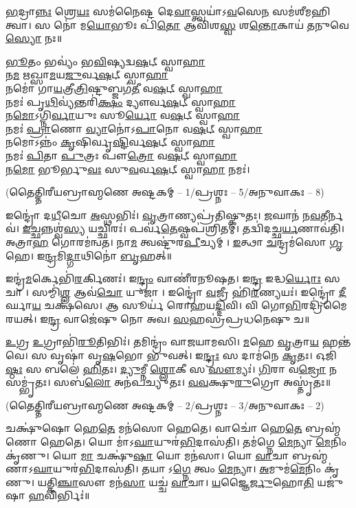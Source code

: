 \ul{𑌭}𑌦𑍍𑌰𑌾\ul{𑌨𑍍𑌨𑌃} 𑌶𑍍𑌰𑍇\ul{𑌯𑌃} 𑌸𑌮॑𑌨𑍈𑌷𑍍𑌟 𑌦𑍇\ul{𑌵𑌾}𑌸𑍍𑌤𑍍𑌵𑌯𑌾॑𑌽\ul{𑌵}𑌸𑍇\ul{𑌨} 𑌸𑌮॑𑌶𑍀𑌮𑌹𑌿 𑌤𑍍𑌵𑌾।
𑌸 𑌨𑍋॑ 𑌮\ul{𑌯𑍋}𑌭𑍂𑌃 𑌪𑌿॑\ul{𑌤𑍋} 𑌆𑌵𑌿॑𑌶\ul{𑌸𑍍𑌵} 𑌶\ul{𑌨𑍍𑌤𑍋}𑌕𑌾𑌯॑ \ul{𑌤}𑌨𑍁𑌵𑍇 \ul{𑌸𑍍𑌯𑍋} 𑌨𑌃॥

\ul{𑌭𑍂}𑌤𑌂 𑌭𑌵𑍍𑌯𑌂॑ 𑌭\ul{𑌵𑌿}𑌷𑍍𑌯𑌦𑍍𑌵\ul{𑌷}𑌟𑍍 𑌸𑍍𑌵𑌾\ul{𑌹𑌾}\\
𑌨\ul{𑌮} 𑌋𑌖𑍍𑌸𑌾\ul{𑌮}𑌯\ul{𑌜𑍁}𑌰𑍍𑌵\ul{𑌷}𑌟𑍍 𑌸𑍍𑌵𑌾\ul{𑌹𑌾}\\
𑌨𑌮𑍋॑ 𑌗𑌾\ul{𑌯}𑌤𑍍𑌰𑍀\ul{𑌤𑍍𑌰𑌿}𑌷𑍍𑌟𑍁𑌬𑍍𑌜𑌗॑\ul{𑌤𑍀} 𑌵\ul{𑌷}𑌟𑍍 𑌸𑍍𑌵𑌾\ul{𑌹𑌾}\\
𑌨𑌮𑌃॑ 𑌪𑍃\ul{𑌥𑌿}𑌵𑍍𑌯॑𑌨𑍍𑌤𑌰𑌿॑\ul{𑌕𑍍𑌷𑌂} 𑌦𑍍𑌯𑍗𑌰𑍍𑌵\ul{𑌷}𑌟𑍍 𑌸𑍍𑌵𑌾\ul{𑌹𑌾}\\
𑌨\ul{𑌮𑍋}𑌽𑌗𑍍𑌨𑌿\ul{𑌰𑍍𑌵𑌾}𑌯𑍁𑌃 𑌸𑍂\ul{𑌰𑍍𑌯𑍋} 𑌵\ul{𑌷}𑌟𑍍 𑌸𑍍𑌵𑌾\ul{𑌹𑌾}\\
𑌨𑌮𑌃॑ \ul{𑌪𑍍𑌰𑌾}𑌣𑍋 \ul{𑌵𑍍𑌯𑌾}𑌨𑍋॑𑌽\ul{𑌪𑌾}𑌨𑍋 𑌵\ul{𑌷}𑌟𑍍 𑌸𑍍𑌵𑌾\ul{𑌹𑌾}\\
𑌨𑌮𑍋𑌽𑌨𑍍𑌨𑌂॑ \ul{𑌕𑍃}𑌷𑌿𑌰𑍍𑌵𑍃\ul{𑌷𑍍𑌟𑌿}𑌰𑍍𑌵\ul{𑌷}𑌟𑍍 𑌸𑍍𑌵𑌾\ul{𑌹𑌾}\\
𑌨𑌮𑌃॑ \ul{𑌪𑌿}𑌤𑌾 \ul{𑌪𑍁}𑌤𑍍𑌰𑌃 𑌪𑍗\ul{𑌤𑍍𑌰𑍋} 𑌵\ul{𑌷}𑌟𑍍 𑌸𑍍𑌵𑌾\ul{𑌹𑌾}\\
𑌨\ul{𑌮𑍋} 𑌭𑍂𑌰𑍍𑌭𑍁\ul{𑌵𑌃} 𑌸𑍁\ul{𑌵}𑌰𑍍𑌵\ul{𑌷}𑌟𑍍 𑌸𑍍𑌵𑌾\ul{𑌹𑌾} 𑌨𑌮𑌃॑।

\centerline{\normalsize (𑌤𑍈𑌤𑍍𑌤𑌿𑌰𑍀𑌯𑌬𑍍𑌰𑌾𑌹𑍍𑌮𑌣𑍇 𑌅𑌷𑍍𑌟𑌕𑌮𑍍 – 1/𑌪𑍍𑌰𑌶𑍍𑌨𑌃 – 5/𑌅𑌨𑍁𑌵𑌾𑌕𑌃 – 8)}

𑌇𑌨𑍍𑌦𑍍𑌰𑍋॑ 𑌦\ul{𑌧𑍀}𑌚𑍋 \ul{𑌅}𑌸𑍍𑌥𑌭𑌿𑌃॑।
\ul{𑌵𑍃}𑌤𑍍𑌰𑌾𑌣𑍍𑌯𑌪𑍍𑌰॑𑌤𑌿𑌷𑍍𑌕𑍁𑌤𑌃।
\ul{𑌜}𑌘𑌾𑌨॑ 𑌨\ul{𑌵}𑌤𑍀𑌰𑍍𑌨𑌵॑।
\ul{𑌇}𑌚𑍍𑌛𑌨𑍍𑌨𑌶𑍍𑌵॑\ul{𑌸𑍍𑌯} 𑌯𑌚𑍍𑌛𑌿𑌰𑌃॑।
𑌪𑌰𑍍𑌵॑\ul{𑌤𑍇}𑌷𑍍𑌵𑌪॑𑌶𑍍𑌰𑌿𑌤𑌮𑍍।
𑌤𑌦𑍍𑌵𑌿॑𑌦𑌚𑍍𑌛\ul{𑌰𑍍𑌯}𑌣𑌾𑌵॑𑌤𑌿।
𑌅𑌤𑍍𑌰𑌾\ul{𑌹} 𑌗𑍋𑌰𑌮॑𑌨𑍍𑌵𑌤।
𑌨𑌾\ul{𑌮} 𑌤𑍍𑌵𑌷𑍍𑌟𑍁॑𑌰\ul{𑌪𑍀}𑌚𑍍𑌯𑌮𑍍।
\ul{𑌇}𑌤𑍍𑌥𑌾 \ul{𑌚}𑌨𑍍𑌦𑍍𑌰𑌮॑𑌸𑍋 \ul{𑌗𑍃}𑌹𑍇।
𑌇\ul{𑌨𑍍𑌦𑍍𑌰}𑌮𑌿\ul{𑌦𑍍𑌗𑌾}𑌥𑌿𑌨𑍋॑ \ul{𑌬𑍃}𑌹𑌤𑍍॥

𑌇𑌨𑍍𑌦𑍍𑌰॑\ul{𑌮}𑌰𑍍𑌕𑍇𑌭𑌿॑\ul{𑌰}𑌰𑍍𑌕𑌿𑌣𑌃॑।
𑌇\ul{𑌨𑍍𑌦𑍍𑌰𑌂} 𑌵𑌾𑌣𑍀॑𑌰𑌨𑍂𑌷𑌤।
𑌇\ul{𑌨𑍍𑌦𑍍𑌰} 𑌇𑌦𑍍𑌧\ul{𑌰𑍍𑌯𑍋𑌃} 𑌸𑌚𑌾।
𑌸𑌮𑍍𑌮𑌿॑\ul{𑌶𑍍𑌲} 𑌆𑌵॑\ul{𑌚𑍋} 𑌯𑍁𑌜𑌾।
𑌇𑌨𑍍𑌦𑍍𑌰𑍋॑ \ul{𑌵}𑌜𑍍𑌰𑍀 𑌹𑌿॑\ul{𑌰}𑌣𑍍𑌯𑌯𑌃॑।
𑌇𑌨𑍍𑌦𑍍𑌰𑍋॑ \ul{𑌦𑍀}𑌰𑍍𑌘𑌾\ul{𑌯} 𑌚𑌕𑍍𑌷॑𑌸𑍇।
𑌆 𑌸𑍂𑌰𑍍𑌯॑ 𑌰𑍋𑌹𑌯\ul{𑌦𑍍𑌦𑌿}𑌵𑌿।
𑌵𑌿 𑌗𑍋\ul{𑌭𑌿}𑌰𑌦𑍍𑌰𑌿॑𑌮𑍈𑌰𑌯𑌤𑍍।
𑌇\ul{𑌨𑍍𑌦𑍍𑌰} 𑌵𑌾𑌜𑍇॑𑌷𑍁 𑌨𑍋 𑌅𑌵।
\ul{𑌸}𑌹𑌸𑍍𑌰॑𑌪𑍍𑌰𑌧𑌨𑍇𑌷𑍁 𑌚॥

\ul{𑌉}𑌗𑍍𑌰 \ul{𑌉}𑌗𑍍𑌰𑌾𑌭𑌿॑\ul{𑌰𑍂}𑌤𑌿𑌭𑌿𑌃॑।
𑌤𑌮𑌿𑌨𑍍𑌦𑍍𑌰𑌂॑ 𑌵𑌾𑌜𑌯𑌾𑌮𑌸𑌿।
\ul{𑌮}𑌹𑍇 \ul{𑌵𑍃}𑌤𑍍𑌰𑌾\ul{𑌯} 𑌹𑌨𑍍𑌤॑𑌵𑍇।
𑌸 𑌵𑍃𑌷𑌾॑ 𑌵𑍃\ul{𑌷}𑌭𑍋 𑌭𑍁॑𑌵𑌤𑍍।
𑌇\ul{𑌨𑍍𑌦𑍍𑌰𑌃} 𑌸 𑌦𑌾𑌮॑𑌨𑍇 \ul{𑌕𑍃}𑌤𑌃।
𑌓𑌜𑌿॑\ul{𑌷𑍍𑌠𑌃} 𑌸 𑌬𑌲𑍇॑ \ul{𑌹𑌿}𑌤𑌃।
\ul{𑌦𑍍𑌯𑍁}𑌮𑍍𑌨𑍀 \ul{𑌶𑍍𑌲𑍋}𑌕𑍀 𑌸 \ul{𑌸𑍗}𑌮𑍍𑌯𑌃॑।
\ul{𑌗𑌿}𑌰𑌾 𑌵\ul{𑌜𑍍𑌰𑍋} 𑌨 𑌸𑌮𑍍𑌭𑍃॑𑌤𑌃।
𑌸𑌬॑\ul{𑌲𑍋} 𑌅𑌨॑𑌪𑌚𑍍𑌯𑍁𑌤𑌃।
\ul{𑌵}\ul{𑌵}𑌕𑍍𑌷𑍁\ul{𑌰𑍁}𑌗𑍍𑌰𑍋 𑌅𑌸𑍍𑌤𑍃॑𑌤𑌃॥

\centerline{\normalsize (𑌤𑍈𑌤𑍍𑌤𑌿𑌰𑍀𑌯𑌬𑍍𑌰𑌾𑌹𑍍𑌮𑌣𑍇 𑌅𑌷𑍍𑌟𑌕𑌮𑍍 – 2/𑌪𑍍𑌰𑌶𑍍𑌨𑌃 – 3/𑌅𑌨𑍁𑌵𑌾𑌕𑌃 – 2)}
𑌚𑌕𑍍𑌷𑍁॑𑌷𑍋 𑌹𑍇\ul{𑌤𑍇} 𑌮𑌨॑𑌸𑍋 𑌹𑍇𑌤𑍇।
𑌵𑌾𑌚𑍋॑ 𑌹𑍇\ul{𑌤𑍇} 𑌬𑍍𑌰𑌹𑍍𑌮॑𑌣𑍋 𑌹𑍇𑌤𑍇।
𑌯𑍋 𑌮𑌾॑𑌽\ul{𑌘𑌾}𑌯𑍁𑌰॑\ul{𑌭𑌿}𑌦𑌾𑌸॑𑌤𑌿।
𑌤𑌮॑𑌗𑍍𑌨𑍇 \ul{𑌮𑍇}𑌨𑍍𑌯𑌾 \ul{𑌮𑍇}𑌨𑌿𑌂 𑌕𑍃॑𑌣𑍁।
𑌯𑍋 \ul{𑌮𑌾} 𑌚𑌕𑍍𑌷𑍁॑\ul{𑌷𑌾} 𑌯𑍋 𑌮𑌨॑𑌸𑌾।
𑌯𑍋 \ul{𑌵𑌾}𑌚𑌾 𑌬𑍍𑌰𑌹𑍍𑌮॑𑌣𑌾𑌽\ul{𑌘𑌾}𑌯𑍁𑌰॑\ul{𑌭𑌿}𑌦𑌾𑌸॑𑌤𑌿।
𑌤𑌯𑌾𑌽\ul{𑌗𑍍𑌨𑍇} 𑌤𑍍𑌵𑌂 \ul{𑌮𑍇}𑌨𑍍𑌯𑌾।
\ul{𑌅}𑌮𑍁𑌮॑\ul{𑌮𑍇}𑌨𑌿𑌂 𑌕𑍃॑𑌣𑍁।
𑌯𑌤𑍍𑌕𑌿\ul{𑌞𑍍𑌚𑌾}𑌸𑍗 𑌮𑌨॑\ul{𑌸𑌾} 𑌯𑌚𑍍𑌚॑ \ul{𑌵𑌾}𑌚𑌾।
\ul{𑌯}𑌜𑍍𑌞𑍈\ul{𑌰𑍍𑌜𑍁}𑌹𑍋\ul{𑌤𑌿} 𑌯𑌜𑍁॑𑌷𑌾 \ul{𑌹}𑌵𑌿𑌰𑍍𑌭𑌿𑌃॑॥

